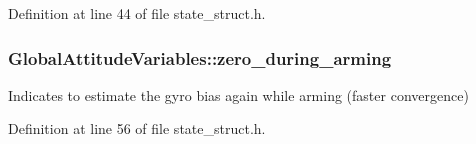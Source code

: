 Definition at line 44 of file state\-\_\-struct.\-h.

\hypertarget{group___state_gaa625401f5bc69c19b54b3171703f37f9}{
\subsubsection[{zero\-\_\-during\-\_\-arming}]{ Global\-Attitude\-Variables\-::zero\-\_\-during\-\_\-arming}}\label{group___state_gaa625401f5bc69c19b54b3171703f37f9}


Indicates to estimate the gyro bias again while arming (faster convergence) 



Definition at line 56 of file state\-\_\-struct.\-h.

